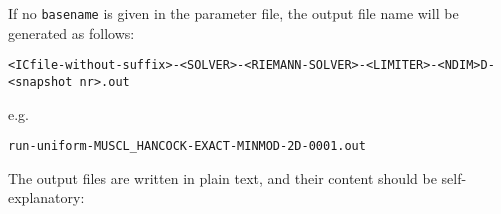 


If no \texttt{basename} is given in the parameter file, the output file
name will be generated as follows:

\begin{lstlisting}
<ICfile-without-suffix>-<SOLVER>-<RIEMANN-SOLVER>-<LIMITER>-<NDIM>D-<snapshot nr>.out
\end{lstlisting}

e.g.

\begin{lstlisting}
run-uniform-MUSCL_HANCOCK-EXACT-MINMOD-2D-0001.out
\end{lstlisting}

The output files are written in plain text, and their content should be
self-explanatory:

